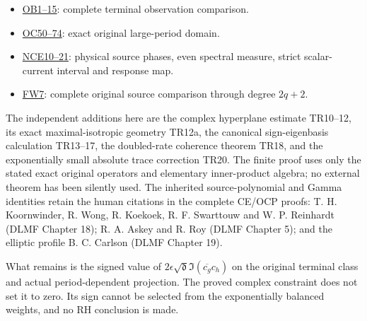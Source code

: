 \documentclass[10pt]{article}
\begin{document}
\begin{itemize}
\tightlist
\item
  \href{https://github.com/KokunoYumeto/zeta-function-research-reader/blob/6cf5b3aa8ff395eba6b5512b28d117334da5767b/workbenches/splitzero-tandem/continuations/20260922-cutoff-profile/RETAINED_COMPLETE_PROOF_SOURCES.tex\#L127618}{OB1--15}: complete terminal observation comparison.
\item
  \href{https://github.com/KokunoYumeto/zeta-function-research-reader/blob/6cf5b3aa8ff395eba6b5512b28d117334da5767b/workbenches/splitzero-tandem/continuations/20260922-cutoff-profile/RETAINED_COMPLETE_PROOF_SOURCES.tex\#L127917}{OC50--74}: exact original large-period domain.
\item
  \href{https://github.com/KokunoYumeto/zeta-function-research-reader/blob/6cf5b3aa8ff395eba6b5512b28d117334da5767b/workbenches/splitzero-tandem/continuations/20260922-cutoff-profile/RETAINED_COMPLETE_PROOF_SOURCES.tex\#L109682}{NCE10--21}: physical source phases, even spectral measure, strict scalar-current interval and response map.
\item
  \href{https://github.com/KokunoYumeto/zeta-function-research-reader/blob/6cf5b3aa8ff395eba6b5512b28d117334da5767b/workbenches/splitzero-tandem/continuations/20260922-cutoff-profile/RETAINED_COMPLETE_PROOF_SOURCES.tex\#L120043}{FW7}: complete original source comparison through degree \(2q+2\).
\end{itemize}

The independent additions here are the complex hyperplane estimate TR10--12, its exact maximal-isotropic geometry TR12a, the canonical sign-eigenbasis calculation TR13--17, the doubled-rate coherence theorem TR18, and the exponentially small absolute trace correction TR20. The finite proof uses only the stated exact original operators and elementary inner-product algebra; no external theorem has been silently used. The inherited source-polynomial and Gamma identities retain the human citations in the complete CE/OCP proofs: T. H. Koornwinder, R. Wong, R. Koekoek, R. F. Swarttouw and W. P. Reinhardt (DLMF Chapter 18); R. A. Askey and R. Roy (DLMF Chapter 5); and the elliptic profile B. C. Carlson (DLMF Chapter 19).

What remains is the signed value of \(2\epsilon\sqrt{\mathfrak d}\Im(\overline{c_g}c_h)\) on the original terminal class and actual period-dependent projection. The proved complex constraint does not set it to zero. Its sign cannot be selected from the exponentially balanced weights, and no RH conclusion is made.
\end{document}
